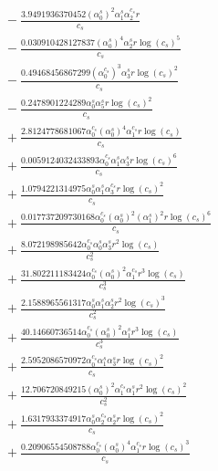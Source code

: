 \documentclass[10pt]{article}
\begin{document}
\begin{align*}
&{}  - \frac{3.9491936370452 \left(\alpha_{0}^s\right)^{2} \alpha_{1}^s \alpha_{2}^{c_s} r}{c_{s}} \\
&{}  - \frac{0.030910428127837 \left(\alpha_{0}^s\right)^{4} \alpha_{2}^s r \log{\left(c_{s} \right)}^{5}}{c_{s}} \\
&{}  - \frac{0.49468456867299 \left(\alpha_{0}^{c_s}\right)^{3} \alpha_{3}^s r \log{\left(c_{s} \right)}^{2}}{c_{s}} \\
&{}  - \frac{0.2478901224289 \alpha_{0}^s \alpha_{5}^s r \log{\left(c_{s} \right)}^{2}}{c_{s}} \\
&{}  + \frac{2.8124778681067 \alpha_{0}^{c_s} \left(\alpha_{0}^s\right)^{4} \alpha_{1}^{c_s} r \log{\left(c_{s} \right)}}{c_{s}} \\
&{}  + \frac{0.0059124032433893 \alpha_{0}^{c_s} \alpha_{1}^s \alpha_{3}^s r \log{\left(c_{s} \right)}^{6}}{c_{s}} \\
&{}  + \frac{1.0794221314975 \alpha_{0}^s \alpha_{1}^s \alpha_{3}^{c_s} r \log{\left(c_{s} \right)}^{2}}{c_{s}} \\
&{}  + \frac{0.017737209730168 \alpha_{0}^{c_s} \left(\alpha_{0}^s\right)^{2} \left(\alpha_{1}^s\right)^{2} r \log{\left(c_{s} \right)}^{6}}{c_{s}} \\
&{}  + \frac{8.072198985642 \alpha_{0}^{c_s} \alpha_{0}^s \alpha_{3}^s r^{2} \log{\left(c_{s} \right)}}{c_{s}^{2}} \\
&{}  + \frac{31.802211183424 \alpha_{0}^{c_s} \left(\alpha_{0}^s\right)^{2} \alpha_{1}^{c_s} r^{3} \log{\left(c_{s} \right)}}{c_{s}^{3}} \\
&{}  + \frac{2.1588965561317 \alpha_{0}^s \alpha_{1}^s \alpha_{2}^s r^{2} \log{\left(c_{s} \right)}^{3}}{c_{s}^{2}} \\
&{}  + \frac{40.14660736514 \alpha_{0}^{c_s} \left(\alpha_{0}^s\right)^{2} \alpha_{1}^s r^{3} \log{\left(c_{s} \right)}}{c_{s}^{3}} \\
&{}  + \frac{2.5952086570972 \alpha_{0}^{c_s} \alpha_{1}^s \alpha_{3}^s r \log{\left(c_{s} \right)}^{2}}{c_{s}} \\
&{}  + \frac{12.706720849215 \left(\alpha_{0}^s\right)^{2} \alpha_{1}^{c_s} \alpha_{1}^s r^{2} \log{\left(c_{s} \right)}^{2}}{c_{s}^{2}} \\
&{}  + \frac{1.6317933374917 \alpha_{0}^s \alpha_{2}^{c_s} \alpha_{2}^s r \log{\left(c_{s} \right)}^{2}}{c_{s}} \\
&{}  + \frac{0.20906554508788 \alpha_{0}^{c_s} \left(\alpha_{0}^s\right)^{4} \alpha_{1}^{c_s} r \log{\left(c_{s} \right)}^{3}}{c_{s}} \\

\end{align*}
\end{document}
